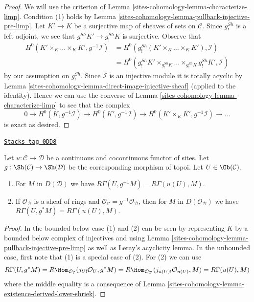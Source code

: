 \begin{proof}
We will use the criterion of Lemma \ref{sites-cohomology-lemma-characterize-limp}.
Condition (1) holds by Lemma \ref{sites-cohomology-lemma-pullback-injective-pre-limp}.
Let $K' \to K$ be a surjective map of sheaves of sets on $\mathcal{C}$.
Since $g_!^{Sh}$ is a left adjoint,
we see that $g_!^{Sh}K' \to g_!^{Sh}K$ is surjective.
Observe that
\begin{align*}
H^0(K' \times_K \ldots \times_K K', g^{-1}\mathcal{I})
& =
H^0(g_!^{Sh}(K' \times_K \ldots \times_K K'), \mathcal{I}) \\
& =
H^0(g_!^{Sh}K' \times_{g_!^{Sh}K} \ldots \times_{g_!^{Sh}K} g_!^{Sh}K',
\mathcal{I})
\end{align*}
by our assumption on $g_!^{Sh}$. Since $\mathcal{I}$ is an injective module
it is totally acyclic by Lemma \ref{sites-cohomology-lemma-direct-image-injective-sheaf}
(applied to the identity). Hence we can use the converse of
Lemma \ref{sites-cohomology-lemma-characterize-limp} to see that the complex
$$
0 \to H^0(K, g^{-1}\mathcal{I}) \to H^0(K', g^{-1}\mathcal{I}) \to
H^0(K' \times_K K', g^{-1}\mathcal{I}) \to \ldots
$$
is exact as desired.
\end{proof}

\begin{lemma}
\label{sites-cohomology-lemma-pullback-same-cohomology}
\href{https://stacks.math.columbia.edu/tag/0DD8}{\texttt{Stacks tag 0DD8}}

Let $u : \mathcal{C} \to \mathcal{D}$ be a continuous and cocontinuous
functor of sites. Let $g : \Sh(\mathcal{C}) \to \Sh(\mathcal{D})$
be the corresponding morphism of topoi. Let $U \in \Ob(\mathcal{C})$.
\begin{enumerate}
\item For $M$ in $D(\mathcal{D})$ we have
$R\Gamma(U, g^{-1}M) = R\Gamma(u(U), M)$.
\item If $\mathcal{O}_\mathcal{D}$ is a sheaf of rings and
$\mathcal{O}_\mathcal{C} = g^{-1}\mathcal{O}_\mathcal{D}$, then
for $M$ in $D(\mathcal{O}_\mathcal{D})$ we have
$R\Gamma(U, g^*M) = R\Gamma(u(U), M)$.
\end{enumerate}
\end{lemma}

\begin{proof}
In the bounded below case (1) and (2) can be seen by representing
$K$ by a bounded below complex of injectives and using
Lemma \ref{sites-cohomology-lemma-pullback-injective-pre-limp} as well as
Leray's acyclicity lemma.
In the unbounded case, first note that
(1) is a special case of (2). For (2) we can use
$$
R\Gamma(U, g^*M) =
R\Hom_{\mathcal{O}_\mathcal{C}}(j_{U!}\mathcal{O}_U, g^*M) =
R\Hom_{\mathcal{O}_\mathcal{D}}(j_{u(U)!}\mathcal{O}_{u(U)}, M) =
R\Gamma(u(U), M)
$$
where the middle equality is a consequence of
Lemma \ref{sites-cohomology-lemma-existence-derived-lower-shriek}.
\end{proof}

